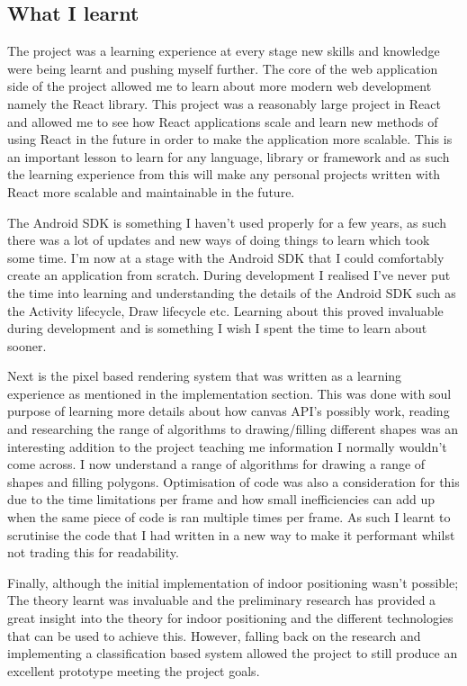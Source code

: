 \subsection{What I learnt} %
The project was a learning experience at every stage new skills and knowledge were being learnt and pushing myself further. The core of the web application side of the project allowed me to learn about more modern web development namely the React library. This project was a reasonably large project in React and allowed me to see how React applications scale and learn new methods of using React in the future in order to make the application more scalable. This is an important lesson to learn for any language, library or framework and as such the learning experience from this will make any personal projects written with React more scalable and maintainable in the future.

The Android SDK is something I haven't used properly for a few years, as such there was a lot of updates and new ways of doing things to learn which took some time. I'm now at a stage with the Android SDK that I could comfortably create an application from scratch. During development I realised I've never put the time into learning and understanding the details of the Android SDK such as the Activity lifecycle, Draw lifecycle etc. Learning about this proved invaluable during development and is something I wish I spent the time to learn about sooner.

Next is the pixel based rendering system that was written as a learning experience as mentioned in the implementation section. This was done with soul purpose of learning more details about how canvas API's possibly work, reading and researching the range of algorithms to drawing/filling different shapes was an interesting addition to the project teaching me information I normally wouldn't come across. I now understand a range of algorithms for drawing a range of shapes and filling polygons. Optimisation of code was also a consideration for this due to the time limitations per frame and how small inefficiencies can add up when the same piece of code is ran multiple times per frame. As such I learnt to scrutinise the code that I had written in a new way to make it performant whilst not trading this for readability.

Finally, although the initial implementation of indoor positioning wasn't possible; The theory learnt was invaluable and the preliminary research has provided a great insight into the theory for indoor positioning and the different technologies that can be used to achieve this. However, falling back on the research and implementing a classification based system allowed the project to still produce an excellent prototype meeting the project goals.


